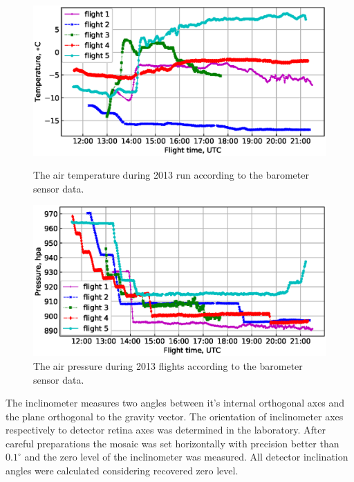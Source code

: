 \documentclass[final,5p,times,twocolumn]{elsarticle}
\begin{document}
\begin{figure}[tb]
  \vspace{1.5pc}

    \begin{minipage}{0.48\textwidth}
    \centering
    \includegraphics[width=\textwidth]{figs/T1.eps}
    \caption{The air temperature during 2013 run according to the barometer sensor data.}
    \label{fig:temperature}
    \end{minipage}
    \hfill
    \begin{minipage}{0.48\textwidth}
    \centering
    \includegraphics[width=\textwidth]{figs/P_hpa0.eps}
    \caption{The air pressure during 2013 flights according to the barometer sensor data.}
    \label{fig:pressure}
    \end{minipage}
\end{figure}

The inclinometer measures two angles between it's internal orthogonal axes and the plane orthogonal to the gravity vector. The orientation of inclinometer axes respectively to detector retina axes was determined in the laboratory. After careful preparations the mosaic was set horizontally with precision better than $0.1^\circ$ and the zero level of the inclinometer was measured. All detector inclination angles were calculated considering recovered zero level.
\end{document}

